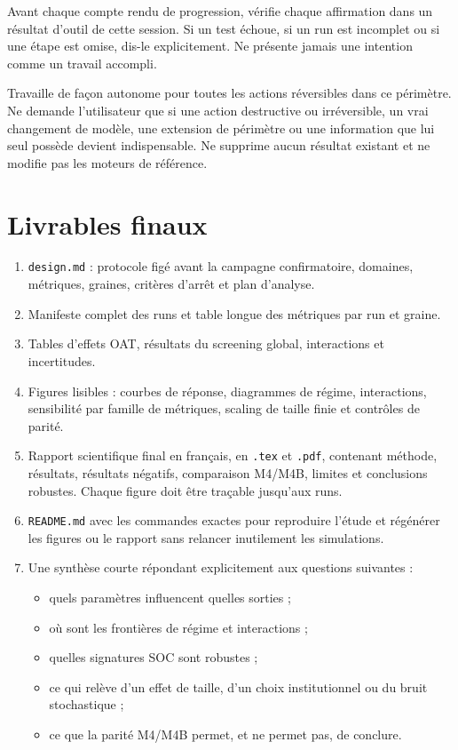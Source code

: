 \documentclass[11pt,a4paper]{article}
\newcommand{\code}[1]{\texttt{\color{navy}#1}}
\begin{document}
Avant chaque compte rendu de progression, vérifie chaque affirmation dans un
résultat d'outil de cette session. Si un test échoue, si un run est incomplet ou
si une étape est omise, dis-le explicitement. Ne présente jamais une intention
comme un travail accompli.

Travaille de façon autonome pour toutes les actions réversibles dans ce
périmètre. Ne demande l'utilisateur que si une action destructive ou
irréversible, un vrai changement de modèle, une extension de périmètre ou une
information que lui seul possède devient indispensable. Ne supprime aucun
résultat existant et ne modifie pas les moteurs de référence.

\section{Livrables finaux}

\begin{enumerate}
  \item \code{design.md} : protocole figé avant la campagne confirmatoire,
    domaines, métriques, graines, critères d'arrêt et plan d'analyse.
  \item Manifeste complet des runs et table longue des métriques par run et
    graine.
  \item Tables d'effets OAT, résultats du screening global, interactions et
    incertitudes.
  \item Figures lisibles : courbes de réponse, diagrammes de régime,
    interactions, sensibilité par famille de métriques, scaling de taille
    finie et contrôles de parité.
  \item Rapport scientifique final en français, en \code{.tex} et
    \code{.pdf}, contenant méthode, résultats, résultats négatifs, comparaison
    M4/M4B, limites et conclusions robustes. Chaque figure doit être traçable
    jusqu'aux runs.
  \item \code{README.md} avec les commandes exactes pour reproduire l'étude et
    régénérer les figures ou le rapport sans relancer inutilement les
    simulations.
  \item Une synthèse courte répondant explicitement aux questions suivantes :
    \begin{itemize}
      \item quels paramètres influencent quelles sorties ;
      \item où sont les frontières de régime et interactions ;
      \item quelles signatures SOC sont robustes ;
      \item ce qui relève d'un effet de taille, d'un choix institutionnel ou
        du bruit stochastique ;
      \item ce que la parité M4/M4B permet, et ne permet pas, de conclure.
    \end{itemize}
\end{enumerate}
\end{document}

